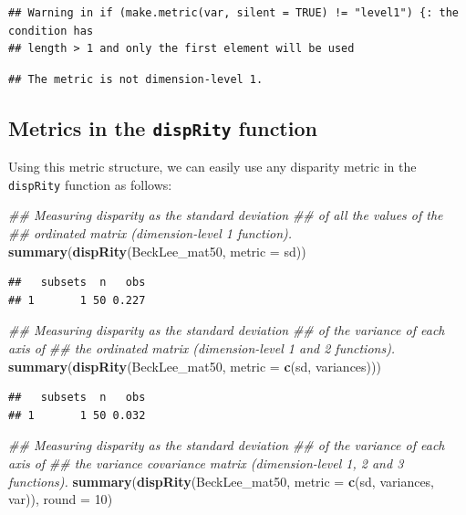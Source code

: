 \documentclass[]{book}
\newenvironment{Shaded}{\begin{snugshade}}{\end{snugshade}}
\newcommand{\CommentTok}[1]{\textcolor[rgb]{0.56,0.35,0.01}{\textit{#1}}}
\newcommand{\DataTypeTok}[1]{\textcolor[rgb]{0.13,0.29,0.53}{#1}}
\newcommand{\DecValTok}[1]{\textcolor[rgb]{0.00,0.00,0.81}{#1}}
\newcommand{\KeywordTok}[1]{\textcolor[rgb]{0.13,0.29,0.53}{\textbf{#1}}}
\newcommand{\NormalTok}[1]{#1}
\begin{document}
\begin{verbatim}
## Warning in if (make.metric(var, silent = TRUE) != "level1") {: the condition has
## length > 1 and only the first element will be used
\end{verbatim}

\begin{verbatim}
## The metric is not dimension-level 1.
\end{verbatim}

\hypertarget{metrics-in-the-disprity-function}{%
\subsection{\texorpdfstring{Metrics in the \texttt{dispRity} function}{Metrics in the dispRity function}}\label{metrics-in-the-disprity-function}}

Using this metric structure, we can easily use any disparity metric in the \texttt{dispRity} function as follows:

\begin{Shaded}
\begin{Highlighting}[]
\CommentTok{## Measuring disparity as the standard deviation}
\CommentTok{## of all the values of the}
\CommentTok{## ordinated matrix (dimension-level 1 function).}
\KeywordTok{summary}\NormalTok{(}\KeywordTok{dispRity}\NormalTok{(BeckLee_mat50, }\DataTypeTok{metric =}\NormalTok{ sd))}
\end{Highlighting}
\end{Shaded}

\begin{verbatim}
##   subsets  n   obs
## 1       1 50 0.227
\end{verbatim}

\begin{Shaded}
\begin{Highlighting}[]
\CommentTok{## Measuring disparity as the standard deviation}
\CommentTok{## of the variance of each axis of}
\CommentTok{## the ordinated matrix (dimension-level 1 and 2 functions).}
\KeywordTok{summary}\NormalTok{(}\KeywordTok{dispRity}\NormalTok{(BeckLee_mat50, }\DataTypeTok{metric =} \KeywordTok{c}\NormalTok{(sd, variances)))}
\end{Highlighting}
\end{Shaded}

\begin{verbatim}
##   subsets  n   obs
## 1       1 50 0.032
\end{verbatim}

\begin{Shaded}
\begin{Highlighting}[]
\CommentTok{## Measuring disparity as the standard deviation}
\CommentTok{## of the variance of each axis of}
\CommentTok{## the variance covariance matrix (dimension-level 1, 2 and 3 functions).}
\KeywordTok{summary}\NormalTok{(}\KeywordTok{dispRity}\NormalTok{(BeckLee_mat50, }\DataTypeTok{metric =} \KeywordTok{c}\NormalTok{(sd, variances, var)), }\DataTypeTok{round =} \DecValTok{10}\NormalTok{)}
\end{Highlighting}
\end{Shaded}
\end{document}
